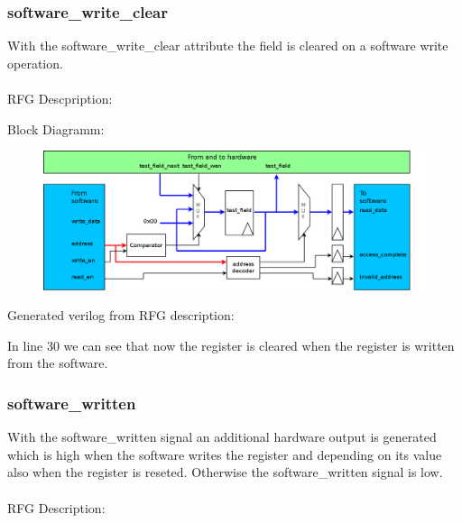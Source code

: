 \documentclass[12pt,a4paper]{article}
\begin{document}
\subsubsection{software\_write\_clear}
With the software\_write\_clear attribute the field is cleared on a software write operation.\\
\\
RFG Descpription:


Block Diagramm:
\begin{figure}[h!]
    \includegraphics[width=\textwidth]{pictures/Reg_hrw_srw_swrite_clear.png}
\end{figure}
\newpage
Generated verilog from RFG description:

In line 30 we can see that now the register is cleared when the register is written from the software.
\newpage

\subsubsection{software\_written}
With the software\_written signal an additional hardware output is generated which is high when the software writes the register and depending on its value also when the register is reseted. Otherwise the software\_written signal is low.\\
\\
RFG Description:

\end{document}
